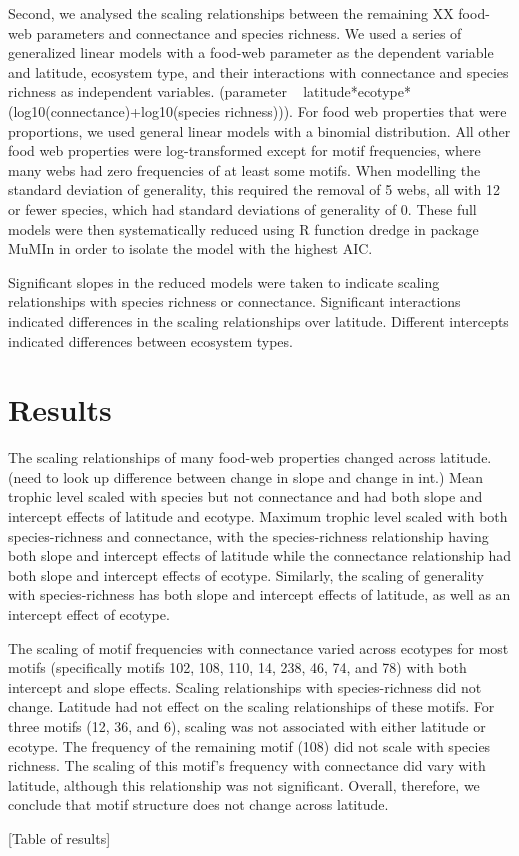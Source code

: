 Second, we analysed the scaling relationships between the remaining XX food-
web parameters and connectance and species richness. We used a series of
generalized linear models with a food-web parameter as the dependent variable
and latitude, ecosystem type, and their interactions with connectance and
species richness as independent variables. (parameter ~
latitude*ecotype*(log10(connectance)+log10(species richness))). For food web
properties that were proportions, we used general linear models with a
binomial distribution. All other food web properties were log-transformed
except for motif frequencies, where many webs had zero frequencies of at least
some motifs. When modelling the standard deviation of generality, this
required the removal of 5 webs, all with 12 or fewer species, which had
standard deviations of generality of 0. These full models were then
systematically reduced using R function dredge \cite{} in package MuMIn
\cite{} in order to isolate the model with the highest AIC.


Significant slopes in the reduced models were taken to indicate scaling
relationships with species richness or connectance. Significant interactions
indicated differences in the scaling relationships over latitude. Different
intercepts indicated differences between ecosystem types.


\section*{Results}

The scaling relationships of many food-web properties changed across latitude.
(need to look up difference between change in slope and change in int.) Mean
trophic level scaled with species but not connectance and had both slope and
intercept effects of latitude and ecotype. Maximum trophic level scaled with
both species-richness and connectance, with the species-richness relationship
having both slope and intercept effects of latitude while the connectance
relationship had both slope and intercept effects of ecotype. Similarly, the
scaling of generality with species-richness has both slope and intercept
effects of latitude, as well as an intercept effect of ecotype.


The scaling of motif frequencies with connectance varied across ecotypes for
most motifs (specifically motifs 102, 108, 110, 14, 238, 46, 74, and 78) with
both intercept and slope effects. Scaling relationships with species-richness
did not change. Latitude had not effect on the scaling relationships of these
motifs. For three motifs (12, 36, and 6), scaling was not associated with
either latitude or ecotype. The frequency of the remaining motif (108) did not
scale with species richness. The scaling of this motif's frequency with
connectance did vary with latitude, although this relationship was not
significant.  Overall, therefore, we conclude that motif structure does not
change across latitude.


[Table of results]






